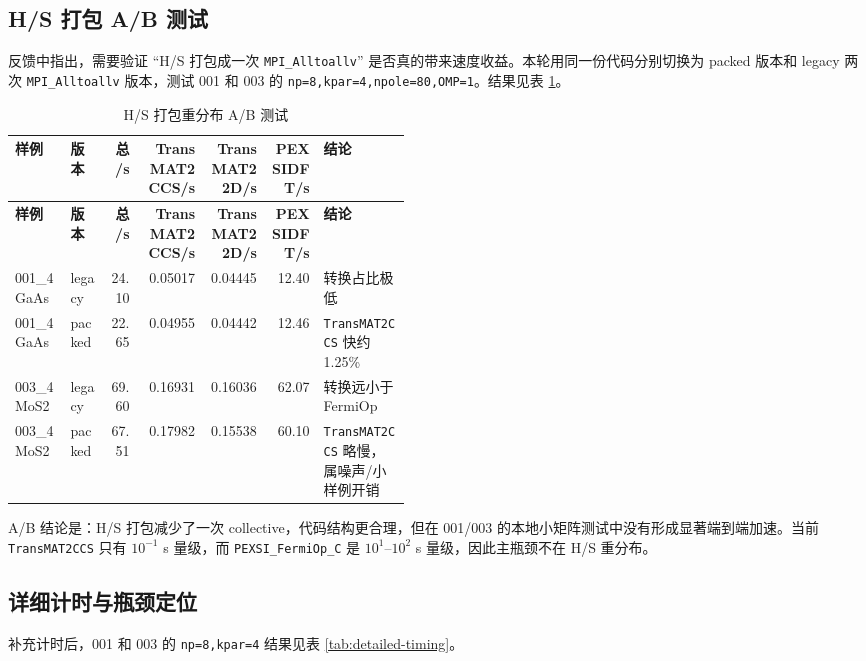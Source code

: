 \documentclass[a4paper,11pt]{article}
\newcommand{\code}[1]{\texttt{#1}}
\begin{document}
\subsection{H/S 打包 A/B 测试}

反馈中指出，需要验证 ``H/S 打包成一次 \code{MPI\_Alltoallv}'' 是否真的带来速度收益。本轮用同一份代码分别切换为 packed 版本和 legacy 两次 \code{MPI\_Alltoallv} 版本，测试 001 和 003 的 \code{np=8,kpar=4,npole=80,OMP=1}。结果见表 \ref{tab:hs-pack-ab}。

{\scriptsize
\begin{longtable}{@{}p{0.14\linewidth}p{0.10\linewidth}r r r r p{0.22\linewidth}@{}}
\caption{H/S 打包重分布 A/B 测试}
\label{tab:hs-pack-ab}\\
\toprule
\textbf{样例} & \textbf{版本} & \textbf{总/s} & \textbf{TransMAT2CCS/s} & \textbf{TransMAT22D/s} & \textbf{PEXSIDFT/s} & \textbf{结论}\\
\midrule
\endfirsthead
\toprule
\textbf{样例} & \textbf{版本} & \textbf{总/s} & \textbf{TransMAT2CCS/s} & \textbf{TransMAT22D/s} & \textbf{PEXSIDFT/s} & \textbf{结论}\\
\midrule
\endhead
001\_4GaAs & legacy & 24.10 & 0.05017 & 0.04445 & 12.40 & 转换占比极低\\
001\_4GaAs & packed & 22.65 & 0.04955 & 0.04442 & 12.46 & \code{TransMAT2CCS} 快约 1.25\%\\
003\_4MoS2 & legacy & 69.60 & 0.16931 & 0.16036 & 62.07 & 转换远小于 FermiOp\\
003\_4MoS2 & packed & 67.51 & 0.17982 & 0.15538 & 60.10 & \code{TransMAT2CCS} 略慢，属噪声/小样例开销\\
\bottomrule
\end{longtable}
}

A/B 结论是：H/S 打包减少了一次 collective，代码结构更合理，但在 001/003 的本地小矩阵测试中没有形成显著端到端加速。当前 \code{TransMAT2CCS} 只有 \(10^{-1}\) s 量级，而 \code{PEXSI\_FermiOp\_C} 是 \(10^1\)--\(10^2\) s 量级，因此主瓶颈不在 H/S 重分布。

\subsection{详细计时与瓶颈定位}

补充计时后，001 和 003 的 \code{np=8,kpar=4} 结果见表 \ref{tab:detailed-timing}。
\end{document}
